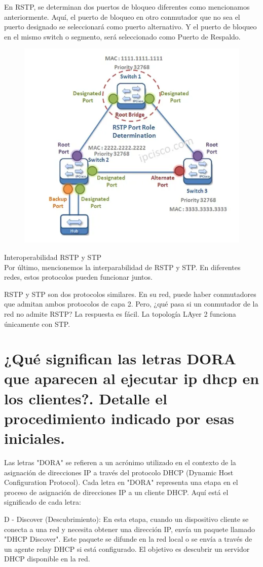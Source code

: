 En RSTP, se determinan dos puertos de bloqueo diferentes como mencionamos anteriormente. Aquí, el puerto de bloqueo en otro conmutador que no sea el puerto designado se seleccionará como puerto alternativo. Y el puerto de bloqueo en el mismo switch o segmento, será seleccionado como Puerto de Respaldo.
\begin{figure}[ph!]
	\centering
	\includegraphics[width=0.7\linewidth]{screenshot003}
	\caption{}
	\label{fig:screenshot003}
\end{figure}


Interoperabilidad RSTP y STP
\\
Por último, mencionemos la interparabilidad de RSTP y STP. En diferentes redes, estos protocolos pueden funcionar juntos.

RSTP y STP son dos protocolos similares. En su red, puede haber conmutadores que admitan ambos protocolos de capa 2. Pero, ¿qué pasa si un conmutador de la red no admite RSTP? La respuesta es fácil. La topología LAyer 2 funciona únicamente con STP.

\section{¿Qué significan las letras DORA que aparecen al ejecutar ip dhcp
en los clientes?. Detalle el procedimiento indicado por esas iniciales.}

Las letras "DORA" se refieren a un acrónimo utilizado en el contexto de la asignación de direcciones IP a través del protocolo DHCP (Dynamic Host Configuration Protocol). Cada letra en "DORA" representa una etapa en el proceso de asignación de direcciones IP a un cliente DHCP. Aquí está el significado de cada letra:

D - Discover (Descubrimiento):
En esta etapa, cuando un dispositivo cliente se conecta a una red y necesita obtener una dirección IP, envía un paquete llamado "DHCP Discover". Este paquete se difunde en la red local o se envía a través de un agente relay DHCP si está configurado. El objetivo es descubrir un servidor DHCP disponible en la red.

